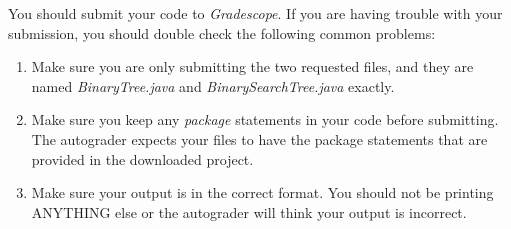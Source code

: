\documentclass[paper=a4, fontsize=11pt, parskip=full]{scrartcl} %
\numberwithin{equation}{section} %
\numberwithin{figure}{section} %
\numberwithin{table}{section} %
\begin{document}
You should submit your code to \emph{Gradescope}. If you are having trouble with your submission, you should double check the following common problems:

\begin{enumerate}
	\item Make sure you are only submitting the two requested files, and they are named \emph{BinaryTree.java} and \emph{BinarySearchTree.java} exactly.
	\item Make sure you keep any \emph{package} statements in your code before submitting. The autograder expects your files to have the package statements that are provided in the downloaded project.
	\item Make sure your output is in the correct format. You should not be printing ANYTHING else or the autograder will think your output is incorrect.
\end{enumerate}




\end{document}
